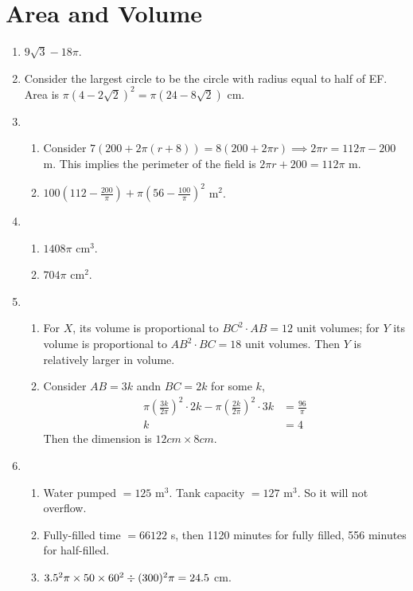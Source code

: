 \documentclass[12pt]{article}
\begin{document}
    \newpage

    \section{Area and Volume}
    \begin{enumerate}
        \item $9\sqrt{3}-18\pi$.
        \item Consider the largest circle to be the circle with radius equal to half of EF. Area is $\pi(4-2\sqrt{2})^2=\pi(24-8\sqrt{2})$ cm.
        \item \begin{enumerate}
            \item Consider $7(200+2\pi (r+8))=8(200+2\pi r) \implies 2\pi r = 112\pi -200$ m. This implies the perimeter of the field is $2\pi r + 200 = 112\pi$ m.
            \item $100(112-\frac{200}{\pi})+\pi(56-\frac{100}{\pi})^2$ m$^2$.
        \end{enumerate}
        \item \begin{enumerate}
            \item $1408\pi$ cm$^3$.
            \item $704\pi$ cm$^2$.
        \end{enumerate}
        \item \begin{enumerate}
            \item For $X$, its volume is proportional to $BC^2\cdot AB = 12$ unit volumes; for $Y$ its volume is proportional to $AB^2\cdot BC = 18$ unit volumes. Then $Y$ is relatively larger in volume.
            \item Consider $AB=3k$ andn $BC=2k$ for some $k$,\begin{align*}
                \pi(\frac{3k}{2\pi})^2\cdot 2k -\pi (\frac{2k}{2\pi})^2\cdot 3k &= \frac{96}{\pi}\\
                k&= 4
            \end{align*}Then the dimension is $12 cm \times 8 cm$.
        \end{enumerate}
        \item \begin{enumerate}
            \item Water pumped $= 125$ m$^3$. Tank capacity $= 127$ m$^3$. So it will not overflow.
            \item Fully-filled time $= 66122$ s, then 1120 minutes for fully filled, 556 minutes for half-filled.
            \item $3.5^2\pi\times 50\times 60^2 \divisionsymbol (300)^2\pi = 24.5$ cm.
        \end{enumerate}
    \end{enumerate}
\end{document}
